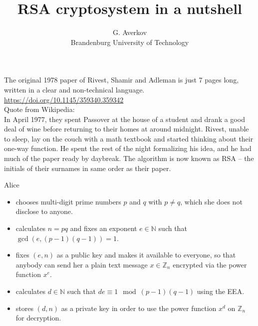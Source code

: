 \documentclass{beamer}
\title{RSA cryptosystem in a nutshell}
\author{G. Averkov \\ Brandenburg University of Technology}
\newcommand{\Z}{\mathbb{Z}}
\newcommand{\N}{\mathbb{N}}
\begin{document}
\begin{frame}[plain]
    \maketitle
\end{frame}

\begin{frame}
	The original 1978 paper of Rivest, Shamir and Adleman is just 7 pages long, written in a clear and non-technical language. 
	\pause 
	\url{https://doi.org/10.1145/359340.359342}
	\vspace{5mm} \\
	\pause
	Quote from Wikipedia: 
	\pause 
	\\ 
	\vspace{5mm} 
	In April 1977, they  spent Passover at the house of a student and drank a good deal of wine before returning to their homes at around midnight. \pause Rivest, unable to sleep, lay on the couch with a math textbook and started thinking about their one-way function. \pause He spent the rest of the night formalizing his idea, and he had much of the paper ready by daybreak. \pause The algorithm is now known as RSA – the initials of their surnames in same order as their paper.
\end{frame} 

\begin{frame}
	\pause 
	Alice 
	\begin{itemize}[<+->] 
		\item   chooses multi-digit prime numbers $p$ and $q$ with $p \ne q$, which she does not disclose to anyone. 
		\item  calculates $n = p q$ and fixes an exponent $e \in \N$ such that $\gcd( e, (p-1) (q-1)) = 1$. 
		\item fixes $(e,n)$ as a public key and makes it available to everyone, so that anybody can send her a plain text message $x \in \Z_n$ encrypted via the power function $x^e$. 
		\item calculates $d \in \N$ such that $d e \equiv 1 \mod (p-1) (q-1)$ using the EEA. 
		\item stores $(d,n)$ as a private key in order to use the power function $x^d$ on $\Z_n$ for decryption. 
	\end{itemize} 
\end{frame}
\end{document}
